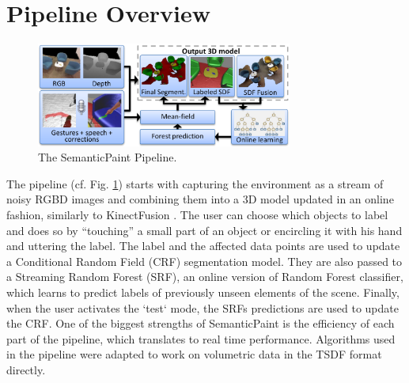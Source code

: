 \documentclass{llncs}
\begin{document}
%     
%     
%     
%     
%     
   
\section{Pipeline Overview}

  \begin{figure}[!ht]
    \center
    \includegraphics[width=0.75\textwidth]{figures/pipeline}
    \caption{The SemanticPaint Pipeline.}
    \label{fig:pipeline}
  \end{figure}
  
    The pipeline (cf. Fig. \ref{fig:pipeline})  starts with capturing the environment as a stream of noisy RGBD images and combining them into a  3D model updated in an online fashion, similarly to KinectFusion \cite{fusion}. The user can choose which objects to label and does so by ``touching'' a small part of an object or encircling it with his hand and uttering the label. The label and the affected data points are used to update a Conditional Random Field (CRF) segmentation model. They are also passed to a Streaming Random Forest (SRF), an online version of Random Forest classifier, which learns to predict labels of previously unseen elements of the scene. Finally, when the user activates the `test` mode, the SRFs predictions are used to update the CRF. One of the biggest strengths of SemanticPaint is the efficiency of each part of the pipeline, which translates to real time performance. Algorithms used in the pipeline were adapted to work on volumetric data in the TSDF \cite{TSDF} format directly.
    
\end{document}
